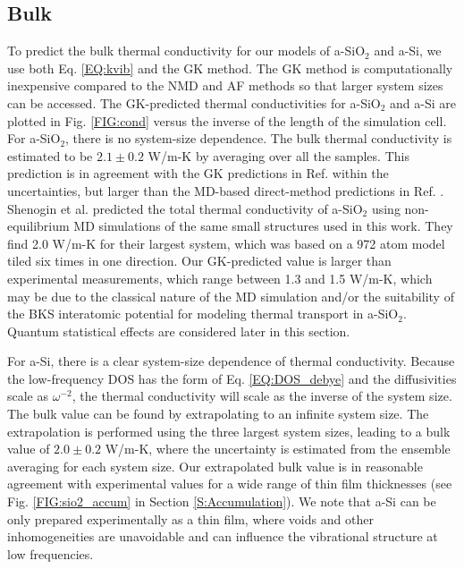 \documentclass[aps,prb,onecolumn,preprint,superscriptaddress,footinbib,amsmath,amssymb,floatfix]{revtex4}
\begin{document}
\subsection{\label{S:Bulk}Bulk}

To predict the bulk thermal conductivity for our models of a-SiO$_2$ and 
a-Si, we use both Eq. \eqref{EQ:kvib} and the GK method. The GK method 
is computationally inexpensive compared to the NMD and AF methods so that 
larger system sizes can be accessed. The GK-predicted thermal 
conductivities for a-SiO$_2$ and a-Si are plotted in Fig. \ref{FIG:cond} 
versus the inverse of the length of the simulation cell. For a-SiO$_2$, 
there is no system-size dependence.  The bulk thermal conductivity is 
estimated to be $2.1 \pm 0.2$ W/m-K by averaging over all the samples. 
This prediction is in agreement with the GK predictions in Ref. 
 within the uncertainties, 
but larger than the MD-based direct-method predictions in Ref. 
. 
Shenogin et al. predicted the total thermal 
conductivity of a-SiO$_2$ using 
non-equilibrium MD simulations of the same small structures 
used in this work.\cite{shenogin_predicting_2009} 
They find 2.0 W/m-K for their largest system, which was based on a 
972 atom model tiled six times in one direction. 
Our GK-predicted value is larger than experimental 
measurements, which range between 
1.3 and 1.5 W/m-K,
\cite{cahill_lattice_1988,lee_heat_1997,
yamane_measurement_2002,regner_broadband_2013} 
which may be due to the classical nature of the MD simulation 
and/or the suitability of the BKS interatomic potential 
for modeling thermal transport in a-SiO$_2$.
\cite{jund_molecular-dynamics_1999,mcgaughey_thermal_2004}
Quantum statistical effects are considered later in this section. 

For a-Si, there is a clear system-size dependence of thermal 
conductivity. 
Because the low-frequency DOS has the form of Eq. \eqref{EQ:DOS_debye} 
and the diffusivities scale as $\omega^{-2}$,  
the thermal conductivity will scale as the inverse of the system size. 
The bulk value can be found by extrapolating to an infinite system size.
\cite{shiomi_thermal_2011,esfarjani_heat_2011,larkin_comparison_2012} 
The extrapolation is performed using the three largest 
system sizes,\cite{mfp_fn2} leading to a bulk value 
of $2.0 \pm 0.2$ W/m-K, where the uncertainty is 
estimated from the ensemble averaging for each system size. 
Our extrapolated bulk value 
is in reasonable agreement with experimental values for a wide 
range of thin film thicknesses (see Fig. \ref{FIG:sio2_accum} in 
Section \ref{S:Accumulation}). 
We note that a-Si can be only prepared experimentally as a thin film, 
where voids and other inhomogeneities are unavoidable
\cite{vacher_attenuation_1980,feldman_thermal_1993,liu_high_2009,
yang_anomalously_2010,li_effect_2011} and can influence the 
vibrational structure at low frequencies.
\end{document}
